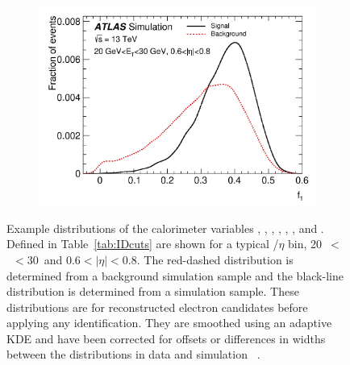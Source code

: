 \begin{figure}[h]
\begin{subfigure}[b]{0.495\textwidth}
    \includegraphics[width=1.0\textwidth]{figs/egamma/f1.png}
    \label{fig:egamma:f1}
  \end{subfigure}
  \caption[Example distributions of the calorimeter variables \rhadone, \fIII, \weta, \rphi, \reta, \deltaEmax, and \fI.]{Example distributions of the calorimeter variables \rhadone, \fIII, \weta, \rphi, \reta, \deltaEmax, and \fI.
    Defined in Table~\ref{tab:IDcuts} are shown for a typical \et/$\eta$ bin, 20~\GeV   $<$ \et\ $<$30~\GeV and $0.6<|\eta|<0.8$.
    The red-dashed distribution is determined from a background simulation sample and the black-line distribution is determined from a \Zee simulation sample.
    These distributions are for reconstructed electron candidates before applying any identification.
    They are smoothed using an adaptive KDE and have been corrected for offsets or differences in widths between the distributions in data and simulation 
    ~\cite{Aaboud:2019ynx}.
}
\label{fig:egamma:calorimeterDepth_pdfs}
\end{figure}

